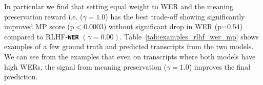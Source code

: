 \documentclass[conference]{IEEEtran}
\begin{document}
\begin{table}[!htbp]
    \centering
        \caption{Adapting the LLM based ASR model to disordered speech on Euphonia with fine-tuning and RLHF. $\uparrow$ and $\downarrow$ indicate higher or lower is better respectively. \textbf{bold} shows best score, and \colorbox{lightblue}{*} is significant w.r.t \texttt{\textbf{WER}}  $(\gamma=0.00)$ strategy.}

    \label{tab:gemma_rlhf}
\end{table}



In particular we find that setting equal weight to WER and the meaning preservation reward i.e. ($\gamma=1.0$) has the best trade-off showing significantly improved MP score (p$<$0.0003) without significant drop in WER (p=$0.54$) compared to RLHF-\texttt{\textbf{WER}}  $(\gamma=0.00)$.
Table~\ref{tab:examples_rlhf_wer_mp} shows examples of a few ground truth and predicted transcripts from the two models. We can see from the examples that even on transcripts where both models have high WERs, the signal from meaning preservation ($\gamma=1.0$) improves the final prediction.
%
\end{document}
